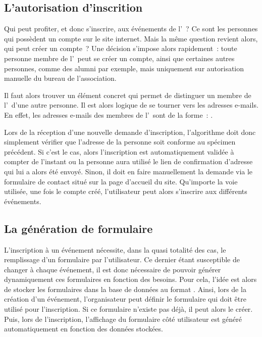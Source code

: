 \subsection{L'autorisation d'inscrition}
\label{subsec:autorisation-inscription}

Qui peut profiter, et donc s'inscrire, aux événements de l'\ofni~? Ce sont les personnes qui possèdent un compte sur le site internet. Mais la même question revient alors, qui peut créer un compte~? Une décision s'impose alors rapidement~: toute personne membre de l'\univ\ peut se créer un compte, ainsi que certaines autres personnes, comme des alumni par exemple, mais uniquement sur autorisation manuelle du bureau de l'association.

Il faut alors trouver un élément concret qui permet de distinguer un membre de l'\univ\ d'une autre personne. Il est alors logique de se tourner vers les adresses e-mails. En effet, les adresses e-mails des membres de l'\univ\ sont de la forme~: .

Lors de la réception d'une nouvelle demande d'inscription, l'algorithme doit donc simplement vérifier que l'adresse  de la personne soit conforme au spécimen précédent. Si c'est le cas, alors l'inscription est automatiquement validée à compter de l'instant ou la personne aura utilisé le lien de confirmation d'adresse qui lui a alors été envoyé. Sinon, il doit en faire manuellement la demande via le formulaire de contact situé sur la page d'accueil du site. Qu'importe la voie utilisée, une fois le compte créé, l'utilisateur peut alors s'inscrire aux différents événements.

\subsection{La génération de formulaire}
\label{subsec:generation-formulaire}

L'inscription à un événement nécessite, dans la quasi totalité des cas, le remplissage d'un formulaire par l'utilisateur. Ce dernier étant susceptible de changer à chaque événement, il est donc nécessaire de pouvoir générer dynamiquement ces formulaires en fonction des besoins. Pour cela, l'idée est alors de stocker les formulaires dans la base de données au format . Ainsi, lors de la création d'un événement, l'organisateur peut définir le formulaire qui doit être utilisé pour l'inscription. Si ce formulaire n'existe pas déjà, il peut alors le créer. Puis, lors de l'inscription, l'affichage du formulaire côté utilisateur est généré automatiquement en fonction des données stockées.

